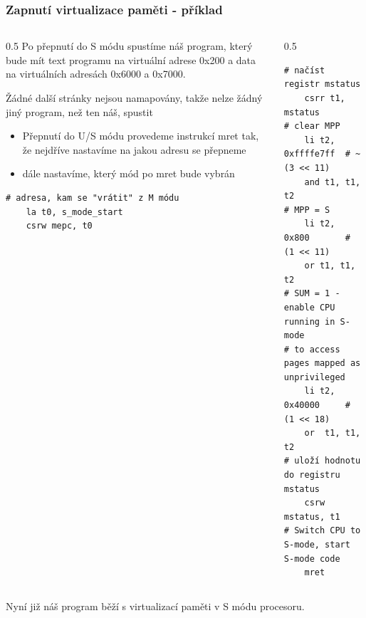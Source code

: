\documentclass[aspectratio=169]{beamer}
\begin{document}
\begin{frame}[fragile]
\frametitle{Zapnutí virtualizace paměti - příklad}

\begin{columns}[t]
\begin{column}{0.5\textwidth}
\small
Po přepnutí do S módu spustíme náš program, který bude mít text programu na virtuální adrese 0x200 a data na virtuálních adresách 0x6000 a 0x7000.

Žádné další stránky nejsou namapovány, takže nelze žádný jiný program, než ten náš, spustit
\begin{itemize}
\item Přepnutí do U/S módu provedeme instrukcí mret tak, že nejdříve nastavíme na jakou adresu se přepneme
\item dále nastavíme, který mód po mret bude vybrán
\end{itemize}
\begin{verbatim}
# adresa, kam se "vrátit" z M módu
    la t0, s_mode_start
    csrw mepc, t0
\end{verbatim}
\end{column}
\hfill
\begin{column}{0.5\textwidth}
\vspace{-0.4cm}
\begin{verbatim}
# načíst registr mstatus
    csrr t1, mstatus
# clear MPP
    li t2, 0xffffe7ff  # ~(3 << 11)
    and t1, t1, t2
# MPP = S
    li t2, 0x800       # (1 << 11)
    or t1, t1, t2
# SUM = 1 - enable CPU running in S-mode
# to access pages mapped as unprivileged
    li t2, 0x40000     # (1 << 18)
    or  t1, t1, t2
# uloží hodnotu do registru mstatus
    csrw mstatus, t1
# Switch CPU to S-mode, start S-mode code
    mret
\end{verbatim}
\end{column}
\end{columns}
Nyní již náš program běží s virtualizací paměti v S módu procesoru.
\end{frame}
\end{document}
